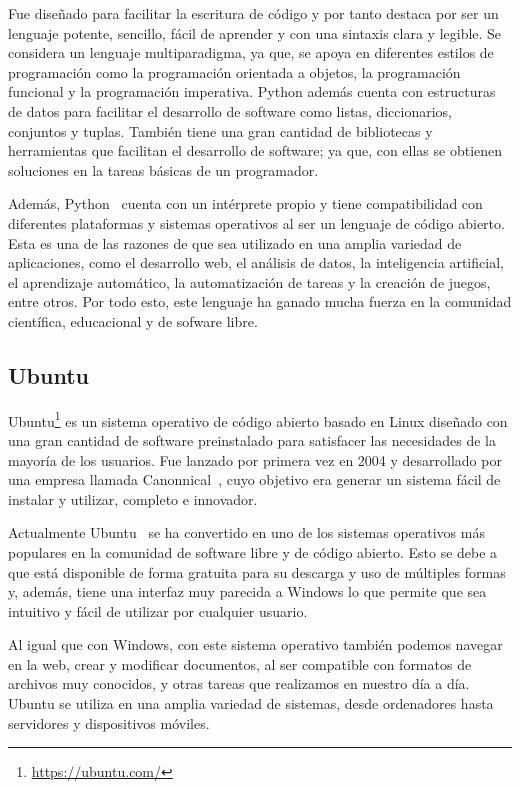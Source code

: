 \documentclass[a4paper, 12pt]{book}
\begin{document}
Fue diseñado para facilitar la escritura de código y por tanto destaca por ser un lenguaje potente, sencillo, fácil de aprender y con una sintaxis clara y legible.
Se considera un lenguaje multiparadigma, ya que, se apoya en diferentes estilos de programación como la programación orientada a objetos, la programación funcional y la programación imperativa.   
Python además cuenta con estructuras de datos para facilitar el desarrollo de software como listas, diccionarios, conjuntos y tuplas.
También tiene una gran cantidad de bibliotecas y herramientas que facilitan el desarrollo de software; ya que, con ellas se obtienen soluciones en la tareas básicas de un programador.


Además, Python~\cite{rios2016evaluacion} cuenta con un intérprete propio y tiene compatibilidad con diferentes plataformas y sistemas operativos al ser un lenguaje de código abierto.
Esta es una de las razones de que sea utilizado en una amplia variedad de aplicaciones, como el desarrollo web, el análisis de datos, la inteligencia artificial, el aprendizaje automático, la automatización de tareas y la creación de juegos, entre otros.
Por todo esto, este lenguaje ha ganado mucha fuerza en la comunidad científica, educacional y de sofware libre.


\subsection{Ubuntu} %
\label{sec:ubuntu} %

Ubuntu\footnote{\url{https://ubuntu.com/}} es un sistema operativo de código abierto basado en Linux diseñado con una gran cantidad de software preinstalado para satisfacer las necesidades de la mayoría de los usuarios.
Fue lanzado por primera vez en 2004 y desarrollado por una empresa llamada Canonnical~\cite{martinez2006software}, cuyo objetivo era generar un sistema fácil de instalar y utilizar, completo e innovador. 


Actualmente Ubuntu~\cite{tavera2013software} se ha convertido en uno de los sistemas operativos más populares en la comunidad de software libre y de código abierto.
Esto se debe a que está disponible de forma gratuita para su descarga y uso de múltiples formas y, además, tiene una interfaz muy parecida a Windows lo que permite que sea intuitivo y fácil de utilizar por cualquier usuario.


Al igual que con Windows, con este sistema operativo también podemos navegar en la web, crear y modificar documentos, al ser compatible con formatos de archivos muy conocidos, y otras tareas que realizamos en nuestro día a día. 
Ubuntu se utiliza en una amplia variedad de sistemas, desde ordenadores hasta servidores y dispositivos móviles. 
\end{document}
